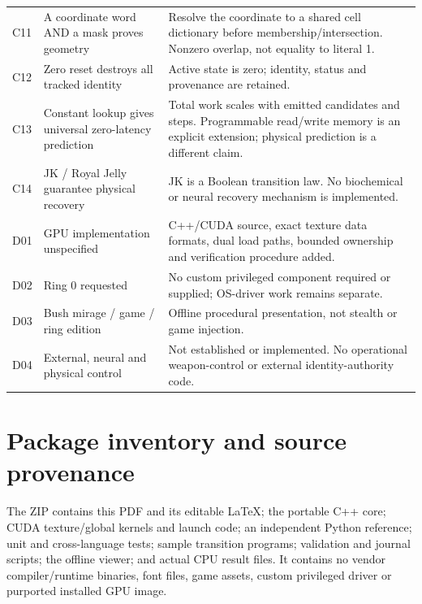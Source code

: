 \documentclass[11pt,a4paper]{article}
\begin{document}
\begin{longtable}{@{}P{13mm}P{52mm}P{96mm}@{}}
C11 & A coordinate word AND a mask proves geometry & Resolve the coordinate to a shared cell dictionary before membership/intersection. Nonzero overlap, not equality to literal 1.\\
C12 & Zero reset destroys all tracked identity & Active state is zero; identity, status and provenance are retained.\\
C13 & Constant lookup gives universal zero-latency prediction & Total work scales with emitted candidates and steps. Programmable read/write memory is an explicit extension; physical prediction is a different claim.\\
C14 & JK / Royal Jelly guarantee physical recovery & JK is a Boolean transition law. No biochemical or neural recovery mechanism is implemented.\\
D01 & GPU implementation unspecified & C++/CUDA source, exact texture data formats, dual load paths, bounded ownership and verification procedure added.\\
D02 & Ring 0 requested & No custom privileged component required or supplied; OS-driver work remains separate.\\
D03 & Bush mirage / game / ring edition & Offline procedural presentation, not stealth or game injection.\\
D04 & External, neural and physical control & Not established or implemented. No operational weapon-control or external identity-authority code.\\
\bottomrule
\end{longtable}\normalsize
\clearpage

\section*{Package inventory and source provenance}
The ZIP contains this PDF and its editable LaTeX; the portable C++ core; CUDA texture/global kernels and launch code; an independent Python reference; unit and cross-language tests; sample transition programs; validation and journal scripts; the offline viewer; and actual CPU result files. It contains no vendor compiler/runtime binaries, font files, game assets, custom privileged driver or purported installed GPU image.
\end{document}
